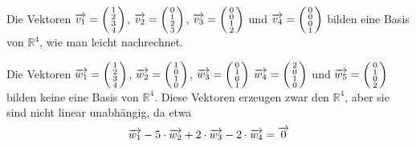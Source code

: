 \begin{beispiel} Die Vektoren  $\overrightarrow{v_1} = 
\left( \begin{smallmatrix} 1 \\ 2 \\ 3 \\ 4
\end{smallmatrix} \right)$, $\overrightarrow{v_2} = \left( \begin{smallmatrix} 0 \\ 1 \\ 2 \\ 3 
\end{smallmatrix} \right)$, $\overrightarrow{v_3} = \left( \begin{smallmatrix} 0 \\ 0 \\ 1 \\ 2 
\end{smallmatrix} \right)$ und  $\overrightarrow{v_4} = \left( \begin{smallmatrix} 0 \\ 0 \\ 0 \\ 1 
\end{smallmatrix} \right)$ bilden eine Basis von $\mathbb R^4$, wie man leicht nachrechnet.
\end{beispiel}

\begin{beispiel} Die Vektoren  $\overrightarrow{w_1} = 
\left( \begin{smallmatrix} 1 \\ 2 \\ 3 \\ 4
\end{smallmatrix} \right)$, $\overrightarrow{w_2} = \left( \begin{smallmatrix} 1 \\ 0 \\ 1 \\ 0 
\end{smallmatrix} \right)$, $\overrightarrow{w_3} = \left( \begin{smallmatrix} 0 \\ 1 \\ 0 \\ 1 
\end{smallmatrix} \right)$ $\overrightarrow{w_4} = \left( \begin{smallmatrix} 2 \\ 0 \\ 1 \\ 0 
\end{smallmatrix} \right)$ und  $\overrightarrow{w_5} = \left( \begin{smallmatrix} 0 \\ 1 \\ 0 \\ 2 
\end{smallmatrix} \right)$ bilden keine eine Basis von $\mathbb R^4$. Diese Vektoren erzeugen zwar 
den $\mathbb R^4$, aber sie sind nicht linear unabhängig, da etwa
  	$$ \overrightarrow{w_1} - 5 \cdot \overrightarrow{w_2} + 2  \cdot \overrightarrow{w_3} - 2  \cdot\overrightarrow{w_4} = \overrightarrow{0} $$
\end{beispiel}

